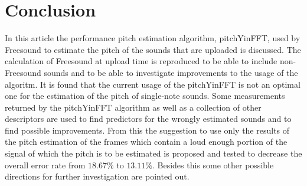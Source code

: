 \documentclass{proc}
\begin{document}
\section{Conclusion}
In this article the performance pitch estimation algorithm, pitchYinFFT, used by Freesound to estimate the pitch of the sounds that are uploaded is discussed. The calculation of Freesound at upload time is reproduced to be able to include non-Freesound sounds and to be able to investigate improvements to the usage of the algoritm. It is found that the current usage of the pitchYinFFT is not an optimal one for the estimation of the pitch of single-note sounds. Some measurements returned by the pitchYinFFT algorithm as well as a collection of other descriptors are used to find predictors for the wrongly estimated sounds and to find possible improvements. From this the suggestion to use only the results of the pitch estimation of the frames which contain a loud enough portion of the signal of which the pitch is to be estimated is proposed and tested to decrease the overall error rate from $18.67\%$ to $13.11\%$. Besides this some other possible directions for further investigation are pointed out. 

\end{document}
